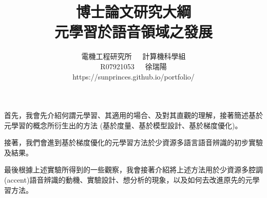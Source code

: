 \documentclass[12pt,UTF8,fntef]{article}
\title{博士論文研究大綱\\元學習於語音領域之發展}
\author{電機工程研究所~~~計算機科學組\\R07921053~~~徐瑞陽 \\ \texttt{}https://sunprinces.github.io/portfolio/}
\date{}
\begin{document}
\maketitle

首先，我會先介紹何謂元學習、其適用的場合、及對其直觀的理解，接著簡述基於元學習的概念所衍生出的方法 (基於度量、基於模型設計、基於梯度優化)。

接著，我們會進到基於梯度優化的元學習方法於少資源多語言語音辨識的初步實驗及結果。

最後根據上述實驗所得到的一些觀察，我會接著介紹將上述方法用於少資源多腔調(accent)語音辨識的動機、實驗設計、想分析的現象，以及如何去改進原先的元學習方法。
\end{document}
